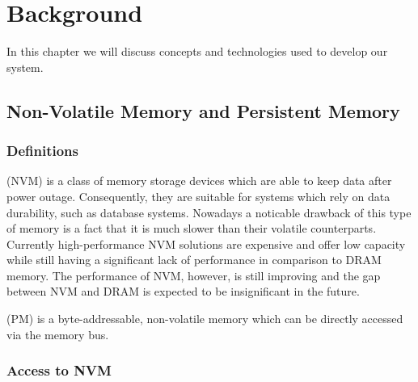 \chapter{Background} \label{Background}

In this chapter we will discuss concepts and technologies used to develop our system.

\section{Non-Volatile Memory and Persistent Memory}
    

    \subsection{Definitions}
        \NVM (NVM) is a class of memory storage devices which are able to keep data after power outage. Consequently, they are suitable for systems which rely on data durability, such as database systems.
        Nowadays a noticable drawback of this type of memory is a fact that it is much slower than their volatile counterparts.  
        Currently high-performance NVM solutions are expensive and offer low capacity while still having a significant lack of performance in comparison to DRAM memory. 
        The performance of NVM, however, is still improving and the gap between NVM and DRAM is expected to be insignificant in the future. 
        
        \PM (PM) is a byte-addressable, non-volatile memory which can be directly accessed via the memory bus.
        
    \subsection{Access to NVM}
    
